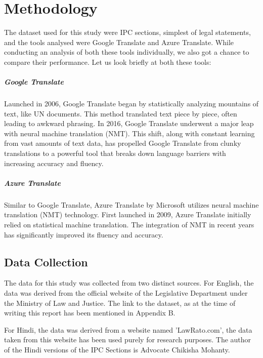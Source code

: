 \chapter{Methodology}\label{chap:meth}

The dataset used for this study were IPC sections, simplest of legal statements, and the tools analysed were Google Translate and Azure Translate. While conducting an analysis of both these tools individually, we also got a chance to compare their performance. Let us look briefly at both these tools:

\paragraph{Google Translate} Launched in 2006, Google Translate began by statistically analyzing mountains of text, like UN documents. This method translated text piece by piece, often leading to awkward phrasing. In 2016, Google Translate underwent a major leap with neural machine translation (NMT). This shift, along with constant learning from vast amounts of text data, has propelled Google Translate from clunky translations to a powerful tool that breaks down language barriers with increasing accuracy and fluency. 

\paragraph{Azure Translate} Similar to Google Translate, Azure Translate by Microsoft utilizes neural machine translation (NMT) technology. First launched in 2009, Azure Translate initially relied on statistical machine translation. The integration of NMT in recent years has significantly improved its fluency and accuracy. 


\section{Data Collection}

The data for this study was collected from two distinct sources. For English, the data was derived from the official website of the Legislative Department under the Ministry of Law and Justice. The link to the dataset, as at the time of writing this report has been mentioned in Appendix B.

For Hindi, the data was derived from a website named 'LawRato.com', the data taken from this website has been used purely for research purposes. The author of the Hindi versions of the IPC Sections is Advocate Chikisha Mohanty.

